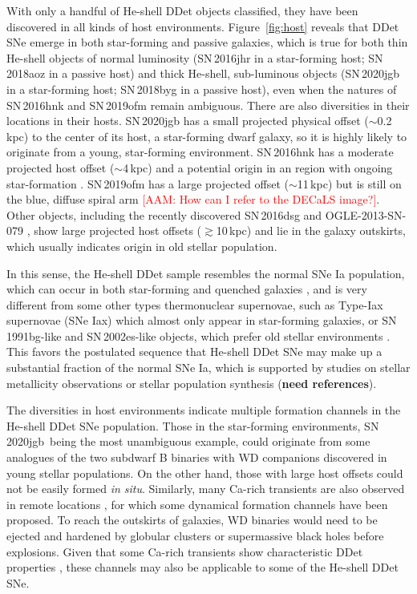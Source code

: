 \documentclass[twocolumn]{aastex631}
\newcommand{\sn}{SN\,2020jgb}
\newcommand{\adam}[1]{\textcolor{red}{[AAM: #1]}}
\begin{document}
With only a handful of He-shell DDet objects classified, they have been discovered in all kinds of host environments. Figure~\ref{fig:host} reveals that DDet SNe emerge in both star-forming and passive galaxies, which is true for both thin He-shell objects of normal luminosity (SN\,2016jhr in a star-forming host; SN\,2018aoz in a passive host) and thick He-shell, sub-luminous objects (SN\,2020jgb in a star-forming host; SN\,2018byg in a passive host), even when the natures of SN\,2016hnk and SN\,2019ofm remain ambiguous. There are also diversities in their locations in their hosts. SN\,2020jgb has a small projected physical offset ($\sim$0.2\,kpc) to the center of its host, a star-forming dwarf galaxy, so it is highly likely to originate from a young, star-forming environment. SN\,2016hnk has a moderate projected host offset ($\sim$4\,kpc) and a potential origin in an  region with ongoing star-formation \citep{galbany_16hnk_2019}. SN\,2019ofm has a large projected offset ($\sim$11\,kpc) but is still on the blue, diffuse spiral arm \adam{How can I refer to the DECaLS image?}. Other objects, including the recently discovered SN\,2016dsg and OGLE-2013-SN-079 \citep{Dong_16dsg_2022}, show large projected host offsets ($\gtrsim$10\,kpc) and lie in the galaxy outskirts, which usually indicates origin in old stellar population.

In this sense, the He-shell DDet sample resembles the normal SNe Ia population, which can occur in both star-forming and quenched galaxies \citep[e.g.,][]{Sullivan_2006, Smith_2012}, and is very different from some other types thermonuclear supernovae, such as Type-Iax supernovae (SNe Iax) which almost only appear in star-forming galaxies, or SN\,1991bg-like and SN\,2002es-like objects, which prefer old stellar environments \citep[see the review in][]{Jha_2019}. This favors the postulated sequence that He-shell DDet SNe may make up a substantial fraction of the normal SNe Ia, which is supported by studies on stellar metallicity observations \citep{Sanders_2021, Eitner_2022} or stellar population synthesis (\textbf{need references}).

The diversities in host environments indicate multiple formation channels in the He-shell DDet SNe population. Those in the star-forming environments, \sn\ being the most unambiguous example, could originate from some analogues of the two subdwarf B binaries with WD companions \citep{Geier_2013, Kupfer_2022} discovered in young stellar populations.
On the other hand, those with large host offsets could not be easily formed {\it in situ}. Similarly, many Ca-rich transients are also observed in remote locations \citep{Lunnan_2017}, for which some dynamical formation channels have been proposed. To reach the outskirts of galaxies, WD binaries would need to be ejected and hardened by globular clusters \citep{Shen_2019} or supermassive black holes \citep{Foley_2015} before explosions. Given that some Ca-rich transients show characteristic DDet properties \citep{de_Ca_rich_2020}, these channels may also be applicable to some of the He-shell DDet SNe. 
\end{document}
